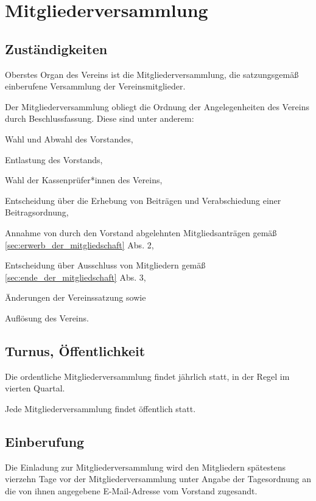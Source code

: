 \chapter{Mitgliederversammlung}

\section{Zuständigkeiten}\label{sec:mv-zustaendigkeit}
\begin{absätze}
	\item Oberstes Organ des Vereins ist die Mitgliederversammlung, die satzungsgemäß einberufene Versammlung der Vereinsmitglieder.
    \item Der Mitgliederversammlung obliegt die Ordnung der Angelegenheiten des Vereins durch Beschlussfassung. Diese sind unter anderem:
    \begin{sätze}
        \item Wahl und Abwahl des Vorstandes,
        \item Entlastung des Vorstands,
        \item Wahl der Kassenprüfer*innen des Vereins,
        \item Entscheidung über die Erhebung von Beiträgen und Verabschiedung einer Beitragsordnung,
        \item Annahme von durch den Vorstand abgelehnten Mitgliedsanträgen gemäß \ref{sec:erwerb_der_mitgliedschaft} Abs. 2,
        \item Entscheidung über Ausschluss von Mitgliedern gemäß \ref{sec:ende_der_mitgliedschaft} Abs. 3,
        \item Änderungen der Vereinssatzung sowie
        \item Auflösung des Vereins.
    \end{sätze}
\end{absätze}

\section{Turnus, Öffentlichkeit}
\begin{absätze}
    \item Die ordentliche Mitgliederversammlung findet jährlich statt, in der Regel im vierten Quartal.
    \item Jede Mitgliederversammlung findet öffentlich statt.
\end{absätze}

\section{Einberufung}\label{sec:einberufung}
Die Einladung zur Mitgliederversammlung wird den Mitgliedern spätestens vierzehn Tage vor der Mitgliederversammlung unter Angabe der Tagesordnung an die von ihnen angegebene E-Mail-Adresse vom Vorstand zugesandt.

